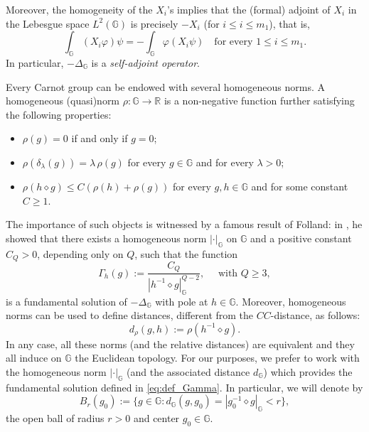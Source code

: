 \documentclass[11pt]{amsart}
\numberwithin{equation}{section} %
\theoremstyle{definition}
\begin{document}
Moreover, the homogeneity of the $X_i$'s implies that the (formal)
adjoint of $X_i$ in the Lebesgue space $L^2(\mathbb{G})$ is precisely $-X_i$ (for $i\leq i\leq m_1$), that is,
\begin{equation} \label{eq:XiSA}
 \int_{\mathbb{G}}(X_i\varphi)\psi = -\int_{\mathbb{G}}\varphi(X_i\psi)\quad\text{for
 every $1\leq i\leq m_1$}.
\end{equation}
In particular, $-\Delta_\mathbb{G}$ is a \emph{self-adjoint operator}.
\medskip

Every Carnot group can be endowed with several homogeneous norms. A homogeneous (quasi)norm $\rho : \mathbb{G} \to \mathbb{R}$ is a non-negative function further satisfying the following properties:
\begin{itemize}
	\item $\rho(g)=0$ if and only if $g=0$;
	\item $\rho(\delta_{\lambda}(g)) = \lambda \, \rho(g)$ for every $g \in \mathbb{G}$ and for every $\lambda >0$;
	\item $\rho(h\diamond g) \leq C \left(\rho(h) + \rho(g)\right)$ for every $g,h \in \mathbb{G}$ and for some constant $C \geq 1$.
\end{itemize}
The importance of such objects is witnessed by a famous result of Folland: in \cite{Folland}, he showed that there exists a homogeneous norm $|\cdot|_{\mathbb{G}}$ on $\mathbb{G}$ and a positive constant $C_Q>0$, depending only on $Q$, such that the function
\begin{equation}\label{eq:def_Gamma}
	\Gamma_{h}(g):= \dfrac{C_Q}{|h^{-1}\diamond g|^{Q-2}_{\mathbb{G}}}, \quad \textrm{ with } Q \geq 3,
\end{equation}
\noindent is a fundamental solution of $-\Delta_{\mathbb{G}}$ with pole at $h \in \mathbb{G}$.
Moreover, homogeneous norms can be used to define distances, different from the $CC$-distance, as follows: 
\begin{equation*}
	d_{\rho}(g,h):= \rho(h^{-1}\diamond g).
\end{equation*}
In any case, all these norms (and the relative distances) are equivalent and they all induce on $\mathbb{G}$ the Euclidean topology. For our purposes, we prefer to work with the homogeneous norm $|\cdot|_{\mathbb{G}}$ (and the associated distance $d_{\mathbb{G}}$) which provides the fundamental solution defined in \eqref{eq:def_Gamma}. In particular, we will denote by 
\begin{equation*}
	B_{r}(g_0) := \{ g \in \mathbb{G}: d_{\mathbb{G}}(g,g_0) = |g_{0}^{-1}\diamond g|_{\mathbb{G}} <r\},
\end{equation*} 
\noindent the open ball of radius $r>0$ and center $g_{0}\in \mathbb{G}$.
\end{document}
